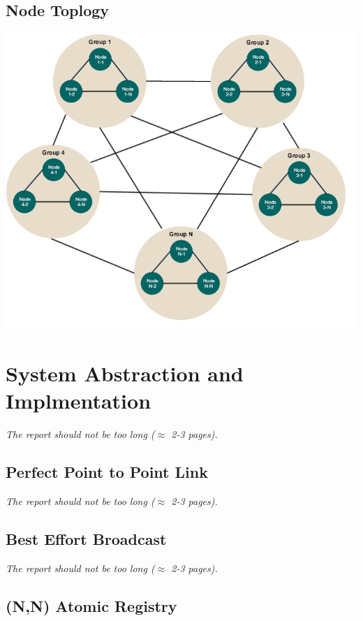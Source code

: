 \documentclass[a4paper, 11pt]{article}
\begin{document}
\subsection{Node Toplogy}
{\centering\includegraphics[scale = 0.6]{./images/node_setup.png}\par}

\section{System Abstraction and Implmentation}
\textit{The report should not be too long ($\approx$
	2-3 pages).}

\subsection{Perfect Point to Point Link}

\textit{The report should not be too long ($\approx$
	2-3 pages).}

\subsection{Best Effort Broadcast}

\textit{The report should not be too long ($\approx$
	2-3 pages).}

\subsection{(N,N) Atomic Registry}
\end{document}

